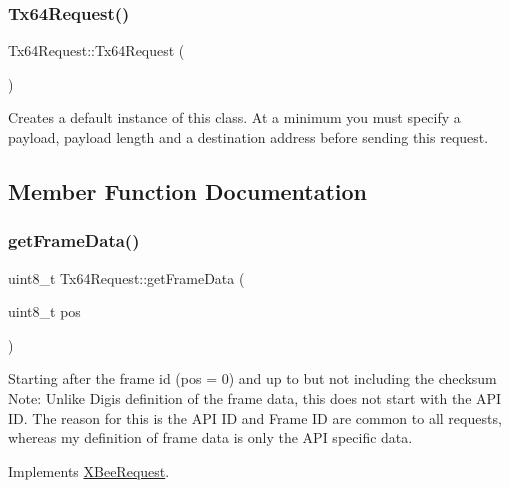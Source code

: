 \subsubsection{\texorpdfstring{Tx64\+Request()}{Tx64Request()}\hspace{0.1cm}{\footnotesize\ttfamily [2/2]}}
{\footnotesize\ttfamily Tx64\+Request\+::\+Tx64\+Request (\begin{DoxyParamCaption}{ }\end{DoxyParamCaption})}

Creates a default instance of this class. At a minimum you must specify a payload, payload length and a destination address before sending this request. 

\subsection{Member Function Documentation}
\hypertarget{class_tx64_request_afe3662433da85acd21f8a3d90844a084}{}\label{class_tx64_request_afe3662433da85acd21f8a3d90844a084} 
\subsubsection{\texorpdfstring{get\+Frame\+Data()}{getFrameData()}}
{\footnotesize\ttfamily uint8\+\_\+t Tx64\+Request\+::get\+Frame\+Data (\begin{DoxyParamCaption}\item[{uint8\+\_\+t}]{pos }\end{DoxyParamCaption})\hspace{0.3cm}{\ttfamily [virtual]}}

Starting after the frame id (pos = 0) and up to but not including the checksum Note\+: Unlike Digi\textquotesingle{}s definition of the frame data, this does not start with the A\+PI ID. The reason for this is the A\+PI ID and Frame ID are common to all requests, whereas my definition of frame data is only the A\+PI specific data. 

Implements \hyperlink{class_x_bee_request_ad5b998cd95a570bdaa4d74c6c8790d94}{X\+Bee\+Request}.

\hypertarget{class_tx64_request_afadc1e07718a62d6c5a75a4bb07dfaae}{}\label{class_tx64_request_afadc1e07718a62d6c5a75a4bb07dfaae} 

